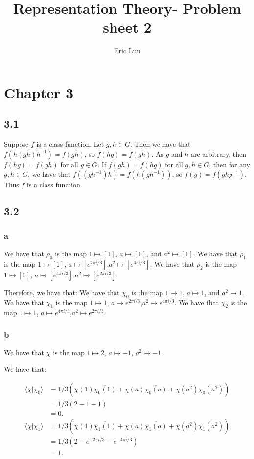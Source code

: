 \documentclass[]{article}
\title{Representation Theory- Problem sheet 2}
\author{Eric Luu}
\begin{document}
\maketitle

\section*{Chapter 3}
\subsection*{3.1}
Suppose $f$ is a class function. Let $g, h \in G$. Then we have that $f(h (gh) h^{-1}) = f(gh)$, so $f(hg) = f(gh)$. As $g$ and $h$ are arbitrary, then $f(hg) = f(gh) $ for all $g \in G$. If $f(gh) = f(hg)$ for all $g, h \in G$, then for any $g, h \in G$, we have that $f((gh^{-1})h)= f(h (gh^{-1}))$, so $f(g) = f(ghg^{-1})$. Thus $f$ is a class function.
\subsection*{3.2}
\subsubsection*{a}
We have that $\rho_0$ is the map $1 \mapsto [1]$, $a \mapsto [1]$, and $a^2 \mapsto [1]$.
We have that $\rho_1$ is the map $1 \mapsto [1]$, $a \mapsto [e^{2 \pi i/3}]$,$a^2 \mapsto [e^{4 \pi i/3}]$.
We have that $\rho_2$ is the map $1 \mapsto [1]$, $a \mapsto [e^{4 \pi i/3}]$,$a^2 \mapsto [e^{2 \pi i/3}]$.

Therefore, we have that:
We have that $\chi_0$ is the map $1 \mapsto 1$, $a \mapsto 1$, and $a^2 \mapsto 1$.
We have that $\chi_1$ is the map $1 \mapsto 1$, $a \mapsto e^{2 \pi i/3}$,$a^2 \mapsto e^{4 \pi i/3}$.
We have that $\chi_2$ is the map $1 \mapsto 1$, $a \mapsto e^{4 \pi i/3}$,$a^2 \mapsto e^{2 \pi i/3}$.

\subsubsection*{b}
We have that $\chi$ is the map $1 \mapsto 2$, $a \mapsto -1$, $a^2 \mapsto -1$. 

We have that:

\begin{align*}
	 \langle \chi | \chi_0 \rangle &= 1/3 \left( \chi(1)\overline{\chi_0(1)} +   \chi(a)\overline{\chi_0(a)} + \chi(a^2)\overline{\chi_0(a^2)}   \right) \\
	 &= 1/3(2 - 1 - 1) \\
	 &= 0.
\end{align*}
\begin{align*}
	\langle \chi | \chi_1 \rangle &= 1/3 \left( \chi(1)\overline{\chi_1(1)} +   \chi(a)\overline{\chi_1(a)} + \chi(a^2)\overline{\chi_1(a^2)}   \right) \\
	&= 1/3(2 -e^{-2 \pi i/3} -  e^{-4 \pi i/3}) \\
	&= 1.
\end{align*}
\end{document}
